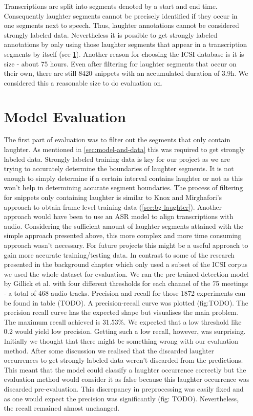 \documentclass[bsc,frontabs,parskip,deptreport]{infthesis}
\begin{document}
Transcriptions are split into segments denoted by a start and end time. Consequently laughter segments cannot be precisely identified if they occur in one segments next to speech. Thus, laughter annotations cannot be considered strongly labeled data. Nevertheless it is possible to get strongly labeled annotations by only using those laughter segments that appear in a transcription segments by itself (see \ref{sec:model-eval}).
Another reason for choosing the ICSI database is it is size - about 75 hours.
Even after filtering for laughter segments that occur on their own, there are still 8420 snippets with an accumulated duration of 3.9h. 
We considered this a reasonable size to do evaluation on. 


\section{Model Evaluation} \label{sec:model-eval}
The first part of evaluation was to filter out the segments that only contain laughter. As mentioned in \ref{sec:model-and-data} this was required to get strongly labeled data. Strongly labeled training data is key for our project as we are trying to accurately determine the boundaries of laughter segments. 
It is not enough to simply determine if a certain interval contains laughter or not as this won't help in determining accurate segment boundaries. 
The process of filtering for snippets only containing laughter is similar to Knox and Mirghafori's approach to obtain frame-level training data \cite{knox2006automatic} (\ref{sec:bg-laughter}). 
Another approach would have been to use an ASR model to align transcriptions with audio. Considering the sufficient amount of laughter segments attained with the simple approach presented above, this more complex and more time consuming approach wasn't necessary. For future projects this might be a useful approach to gain more accurate training/testing data. 
In contrast to some of the research presented in the background chapter which only used a subset of the ICSI corpus we used the whole dataset for evaluation. We ran the pre-trained detection model by Gillick et al. with four different thresholds for each channel of the 75 meetings - a total of 468 audio tracks. 
Precision and recall for those 1872 experiments can be found in table (TODO).
A precision-recall curve was plotted (fig:TODO). The precision recall curve has the expected shape but visualises the main problem. The maximum recall achieved is 31.53\%. We expected that a low threshold like 0.2 would yield low precision. Getting such a low recall, however, was surprising. 
Initially we thought that there might be something wrong with our evaluation method. After some discussion we realised that the discarded laughter occurrences to get strongly labeled data weren't discarded from the predictions. This meant that the model could classify a laughter occurrence correctly but the evaluation method would consider it as false because this laughter occurrence was discarded pre-evaluation. This discrepancy in preprocessing was easily fixed and as one would expect the precision was significantly (fig: TODO). Nevertheless, the recall remained almost unchanged. 
\end{document}

